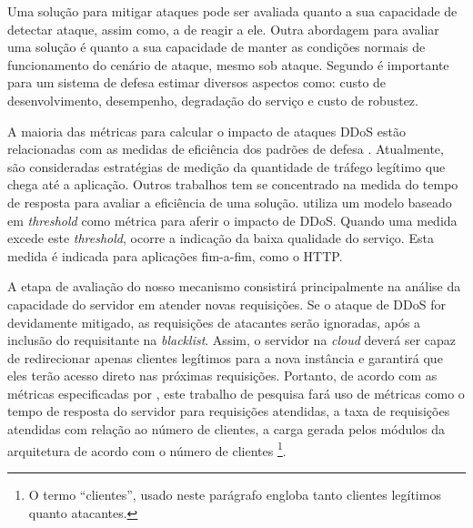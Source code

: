 

%
Uma solução para mitigar ataques pode ser avaliada quanto a sua capacidade de detectar ataque, assim como, a de reagir a ele. Outra abordagem para avaliar uma solução é quanto a sua capacidade de manter as condições normais de funcionamento do cenário de ataque, mesmo sob ataque. Segundo \cite{4600003} é importante para um sistema de defesa estimar diversos aspectos como: custo de desenvolvimento, desempenho, degradação do serviço e custo de robustez. 

A maioria das métricas para calcular o impacto de ataques DDoS estão relacionadas com as medidas de eficiência dos padrões de defesa \cite{4809152}. Atualmente, são consideradas estratégias de medição da quantidade de tráfego legítimo que chega até a aplicação. Outros trabalhos tem se concentrado na medida do tempo de resposta para avaliar a eficiência de uma solução. \cite{Mirkovic:2007:TUM:1281700.1281708} utiliza um modelo baseado em \emph{threshold} como métrica para aferir o impacto de DDoS. Quando uma medida excede este \emph{threshold}, ocorre a  indicação da baixa qualidade do serviço. Esta medida é indicada para aplicações fim-a-fim, como o HTTP.


A etapa de avaliação do nosso mecanismo consistirá principalmente na análise
da capacidade do servidor em atender novas requisições. Se o ataque de DDoS for devidamente
mitigado, as requisições de atacantes serão ignoradas, após a inclusão do requisitante na \emph{blacklist}. Assim, o servidor na \emph{cloud} deverá ser capaz de redirecionar apenas clientes legítimos 
para a nova instância e garantirá que eles terão acesso direto nas próximas requisições. %
Portanto, de acordo com as métricas especificadas por \cite{4600003}, este trabalho de pesquisa fará uso de métricas como o tempo de resposta do servidor para requisições atendidas, a taxa de requisições atendidas com relação ao número de clientes, a carga gerada pelos módulos da arquitetura de acordo com o número de clientes \footnote{O termo ``clientes'', usado neste parágrafo engloba tanto clientes legítimos quanto atacantes.}. 

